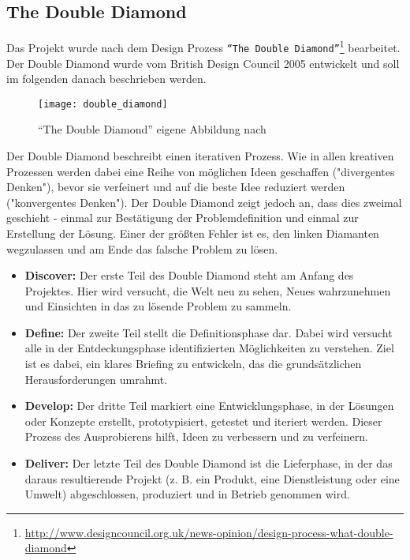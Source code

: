 \subsection{The Double Diamond}
\label{sub:the_double_diamond}
  Das Projekt wurde nach dem Design Prozess \texttt{"`The Double Diamond"'}\footnote{\url{http://www.designcouncil.org.uk/news-opinion/design-process-what-double-diamond}} bearbeitet. Der Double Diamond wurde vom British Design Council 2005 entwickelt und soll im folgenden danach beschrieben werden.\parencite{designcouncil}

  \begin{figure}[htbp]
    \begin{center}
      \texttt{[image: double\_diamond]}
      \caption{"`The Double Diamond"' eigene Abbildung nach \parencite{designcouncil}}
      \label{fig:double_diamond}
    \end{center}
  \end{figure}

  Der Double Diamond beschreibt einen iterativen Prozess. Wie in allen kreativen Prozessen werden dabei eine Reihe von möglichen Ideen geschaffen ("divergentes Denken"), bevor sie verfeinert und auf die beste Idee reduziert werden ("konvergentes Denken"). Der Double Diamond zeigt jedoch an, dass dies zweimal geschieht - einmal zur Bestätigung der Problemdefinition und einmal zur Erstellung der Lösung. Einer der größten Fehler ist es, den linken Diamanten wegzulassen und am Ende das falsche Problem zu lösen.

  \begin{itemize}[label={}]
    \item \textbf{Discover:} Der erste Teil des Double Diamond steht am Anfang des Projektes. Hier wird versucht, die Welt neu zu sehen, Neues wahrzunehmen und Einsichten in das zu lösende Problem zu sammeln.

    \item \textbf{Define:} Der zweite Teil stellt die Definitionsphase dar. Dabei wird versucht alle in der Entdeckungsphase identifizierten Möglichkeiten zu verstehen. Ziel ist es dabei, ein klares Briefing zu entwickeln, das die grundsätzlichen Herausforderungen umrahmt.

    \item \textbf{Develop:} Der dritte Teil markiert eine Entwicklungsphase, in der Lösungen oder Konzepte erstellt, prototypisiert, getestet und iteriert werden. Dieser Prozess des Ausprobierens hilft, Ideen zu verbessern und zu verfeinern.

    \item \textbf{Deliver:} Der letzte Teil des Double Diamond ist die Lieferphase, in der das daraus resultierende Projekt (z. B. ein Produkt, eine Dienstleistung oder eine Umwelt) abgeschlossen, produziert und in Betrieb genommen wird.
  \end{itemize}

